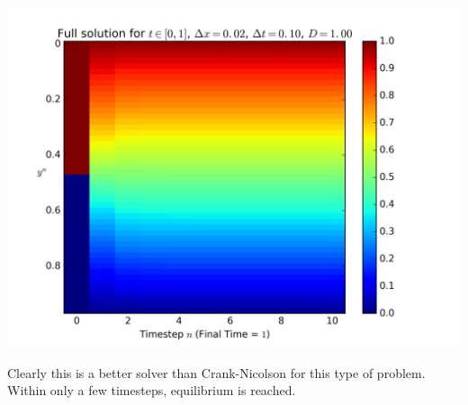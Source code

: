 \documentclass{article} %
\theoremstyle{plain}
\numberwithin{equation}{section} %
\numberwithin{figure}{section} %
\numberwithin{table}{section} %
\begin{document}
\begin{enumerate}[\ \ (a)]
    \begin{minipage}{\textwidth}
        \includegraphics[width=\textwidth]{problem_3b.png}
    \end{minipage}
    Clearly this is a better solver than Crank-Nicolson for this type of problem.  Within only a few timesteps, equilibrium is reached.
\end{enumerate}
\end{document}
